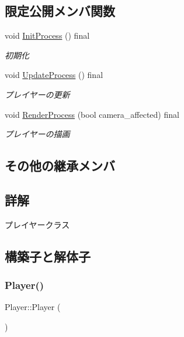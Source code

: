\subsection*{限定公開メンバ関数}
\begin{DoxyCompactItemize}
\item 
void \mbox{\hyperlink{class_player_a1051f85c8bf18a256d275d1a1dee5da6}{Init\+Process}} () final
\begin{DoxyCompactList}\small\item\em 初期化 \end{DoxyCompactList}\item 
void \mbox{\hyperlink{class_player_ab8accc9b83b030f5313f1b4872a7e634}{Update\+Process}} () final
\begin{DoxyCompactList}\small\item\em プレイヤーの更新 \end{DoxyCompactList}\item 
void \mbox{\hyperlink{class_player_a8ac2e54fe5672d32186456b9735c02c3}{Render\+Process}} (bool camera\+\_\+affected) final
\begin{DoxyCompactList}\small\item\em プレイヤーの描画 \end{DoxyCompactList}\end{DoxyCompactItemize}
\subsection*{その他の継承メンバ}


\subsection{詳解}
プレイヤークラス 

\subsection{構築子と解体子}
\mbox{\label{class_player_affe0cc3cb714f6deb4e62f0c0d3f1fd8}} 
\subsubsection{\texorpdfstring{Player()}{Player()}}
{\footnotesize\ttfamily Player\+::\+Player (\begin{DoxyParamCaption}{ }\end{DoxyParamCaption})\hspace{0.3cm}{\ttfamily [inline]}}



